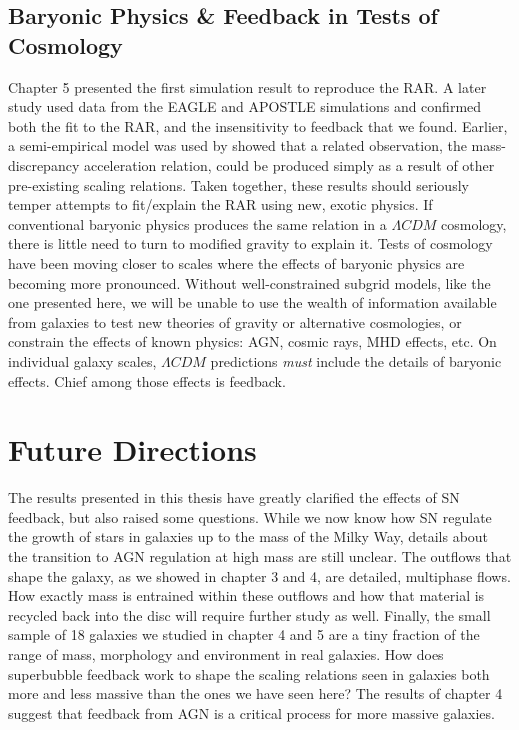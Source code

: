 \subsection{Baryonic Physics \& Feedback in Tests of Cosmology}
Chapter 5 presented the first simulation result to reproduce the
\citet{McGaugh2016} RAR.  A later study \citep{Ludlow2016} used data from the
EAGLE \citep{Schaye2015} and APOSTLE \citep{Sawala2016} simulations and
confirmed both the fit to the RAR, and the insensitivity to feedback that we
found.  Earlier, a semi-empirical model was used by \citet{DiCintio2016} showed
that a related observation, the mass-discrepancy acceleration relation, could be
produced simply as a result of other pre-existing scaling relations.  Taken
together, these results should seriously temper attempts to fit/explain the RAR
using new, exotic physics.  If conventional baryonic physics produces the same
relation in a $\Lambda CDM$ cosmology, there is little need to turn to modified
gravity \citep{Moffat2016,Verlinde2016,Burrage2016} to explain it.  Tests of
cosmology have been moving closer to scales where the effects of baryonic
physics are becoming more pronounced.  Without well-constrained subgrid models,
like the one presented here, we will be unable to use the wealth of information
available from galaxies to test new theories of gravity or alternative
cosmologies, or constrain the effects of known physics: AGN, cosmic rays,
MHD effects, etc.  On individual galaxy scales, $\Lambda CDM$ predictions {\it must}
include the details of baryonic effects.  Chief among those effects is feedback.

\section{Future Directions}
The results presented in this thesis have greatly clarified the effects of SN
feedback, but also raised some questions.  While we now know how SN regulate the
growth of stars in galaxies up to the mass of the Milky Way, details about the
transition to AGN regulation at high mass are still unclear.  The outflows that
shape the galaxy, as we showed in chapter 3 and 4, are detailed, multiphase
flows.  How exactly mass is entrained within these outflows and how that
material is recycled back into the disc will require further study as well.
Finally, the small sample of 18 galaxies we studied in chapter 4 and 5 are a
tiny fraction of the range of mass, morphology and environment in real
galaxies.  How does superbubble feedback work to shape the scaling relations
seen in galaxies both more and less massive than the ones we have seen here?
The results of chapter 4 suggest that feedback from AGN is a critical process
for more massive galaxies.

